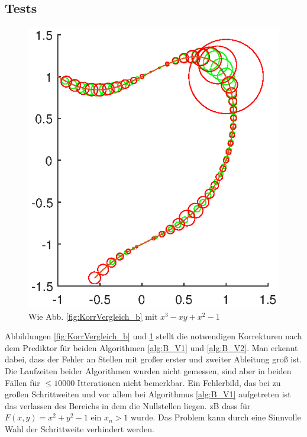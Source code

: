 \documentclass[a4paper,11pt,bibliography=totoc,listof=totoc,headinclude=true,cleardoublepage=empty,oneside]{scrartcl}
\begin{document}
\subsection{Tests}
\begin{figure}
	\centering
	\includegraphics[width=1\linewidth]{plots/B/VergleichKorrektur_2.eps}
	\caption{Wie Abb. \ref{fig:KorrVergleich_b} mit $x^3-xy+x^2-1$}
	\label{fig:KorrVergleich2_b}
\end{figure}
Abbildungen \ref{fig:KorrVergleich_b} und \ref{fig:KorrVergleich2_b} stellt die notwendigen Korrekturen nach dem Prediktor für beiden Algorithmen \ref{alg:B_V1} und \ref{alg:B_V2}. Man erkennt dabei, dass der Fehler an Stellen mit großer erster und zweiter Ableitung groß ist.
Die Laufzeiten beider Algorithmen wurden nicht gemessen, sind aber in beiden Fällen für $\leq10000$ Itterationen nicht bemerkbar.
Ein Fehlerbild, das bei zu großen Schrittweiten und vor allem bei Algorithmus \ref{alg:B_V1} aufgetreten ist das verlassen des Bereichs in dem die Nullstellen liegen. zB dass für $F(x,y)=x^2+y^2-1$ ein $x_n > 1$ wurde. Das Problem kann durch eine Sinnvolle Wahl der Schrittweite verhindert werden.
\end{document}
